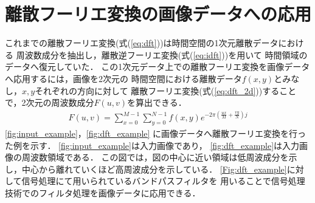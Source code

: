 \section{離散フーリエ変換の画像データへの応用}

これまでの離散フーリエ変換(式(\ref{eq:dft}))は時間空間の1次元離散データにおける
周波数成分を抽出し，離散逆フーリエ変換(式(\ref{eq:idft}))を用いて
時間領域のデータへ復元していた．
この1次元データ上での離散フーリエ変換を画像データへ応用するには，画像を2次元の
時間空間における離散データ$f(x, y)$とみなし，$x, y$それぞれの方向に対して
離散フーリエ変換(式(\ref{eq:dft_2d}))することで，2次元の周波数成分$F(u, v)$を算出できる．
\begin{align}
  F(u, v) = \sum_{x = 0}^{M-1} \sum_{y = 0}^{N-1} f(x, y) e ^ {- 2 \pi \left(\frac{ux}{M} + \frac{vy}{N} \right) j} \label{eq:dft_2d}
\end{align}
\autoref{fig:input_example}，\autoref{fig:dft_example}
に画像データへ離散フーリエ変換を行った例を示す．
\autoref{fig:input_example}は入力画像であり，
\autoref{fig:dft_example}は入力画像の周波数領域である．
この図では，図の中心に近い領域は低周波成分を示し，中心から離れていくほど高周波成分を示している．
\autoref{Fig:dft_example}に対して信号処理にて用いられているバンドパスフィルタを
用いることで信号処理技術でのフィルタ処理を画像データに応用できる．


